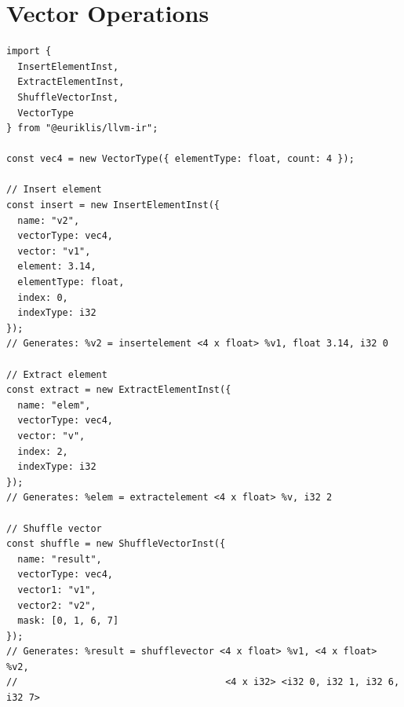 \section{Vector Operations}

\begin{lstlisting}[style=ts]
import {
  InsertElementInst,
  ExtractElementInst,
  ShuffleVectorInst,
  VectorType
} from "@euriklis/llvm-ir";

const vec4 = new VectorType({ elementType: float, count: 4 });

// Insert element
const insert = new InsertElementInst({
  name: "v2",
  vectorType: vec4,
  vector: "v1",
  element: 3.14,
  elementType: float,
  index: 0,
  indexType: i32
});
// Generates: %v2 = insertelement <4 x float> %v1, float 3.14, i32 0

// Extract element
const extract = new ExtractElementInst({
  name: "elem",
  vectorType: vec4,
  vector: "v",
  index: 2,
  indexType: i32
});
// Generates: %elem = extractelement <4 x float> %v, i32 2

// Shuffle vector
const shuffle = new ShuffleVectorInst({
  name: "result",
  vectorType: vec4,
  vector1: "v1",
  vector2: "v2",
  mask: [0, 1, 6, 7]
});
// Generates: %result = shufflevector <4 x float> %v1, <4 x float> %v2,
//                                     <4 x i32> <i32 0, i32 1, i32 6, i32 7>
\end{lstlisting}

